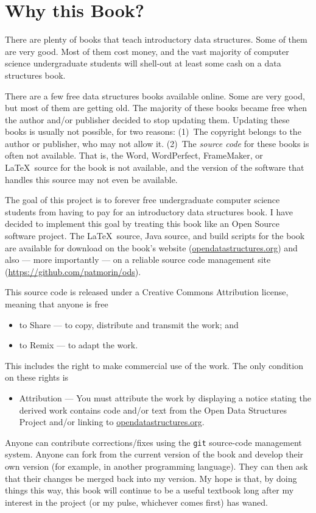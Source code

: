 \section*{Why this Book?}

There are plenty of books that teach introductory data structures.
Some of them are very good.  Most of them cost money, and the vast
majority of computer science undergraduate students will shell-out at
least some cash on a data structures book.

There are a few free data structures books available online.  Some are
very good, but most of them are getting old.  The majority of these
books became free when the author and/or publisher decided to stop
updating them.  Updating these books is usually not possible, for two
reasons:  (1)~The copyright belongs to the author or publisher, who
may not allow it.  (2)~The \emph{source code} for these books is often
not available.  That is, the Word, WordPerfect, FrameMaker, or \LaTeX\
source for the book is not available, and the version of the software
that handles this source may not even be available.

The goal of this project is to forever free undergraduate computer science
students from having to pay for an introductory data structures book.
I have decided to implement this goal by treating this book like an
Open Source software project.  The \LaTeX\ source, Java source, and
build scripts for the book are available for download on the book's website
(\url{opendatastructures.org}) and also --- more importantly --- on a reliable
source code management site (\url{https://github.com/patmorin/ods}).

This source code is released under a Creative Commons Attribution license,
meaning that anyone is free
\begin{itemize}
  \item to Share --- to copy, distribute and transmit the work; and
  \item to Remix --- to adapt the work.
\end{itemize}
This includes the right to make commercial use of the work.  The only
condition on these rights is
\begin{itemize}
  \item Attribution --- You must attribute the work by displaying a
  notice stating the derived work contains code and/or text from the
  Open Data Structures Project and/or linking to
  \url{opendatastructures.org}.
\end{itemize}

Anyone can contribute corrections/fixes using the \texttt{git} source-code
management system.  Anyone can fork from the current version of the
book and develop their own version (for example, in another programming
language).  They can then ask that their changes be merged back into
my version.  My hope is that, by doing things this way, this book will
continue to be a useful textbook long after my interest in the project
(or my pulse, whichever comes first) has waned.


